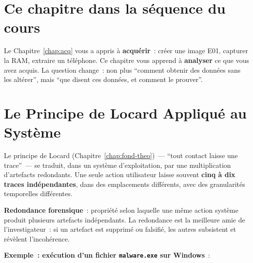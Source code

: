 \bigskip

\section*{Ce chapitre dans la séquence du cours}

Le Chapitre~\ref{chap:acq} vous a appris à \textbf{acquérir}~: créer
une image E01, capturer la RAM, extraire un téléphone. Ce chapitre vous
apprend à \textbf{analyser} ce que vous avez acquis. La question change~:
non plus ``comment obtenir des données sans les altérer'', mais
``que disent ces données, et comment le prouver''.

\separateur

\section{Le Principe de Locard Appliqué au Système}
\label{sec:locard-systeme}

Le principe de Locard (Chapitre~\ref{chap:fond-theo})~--- ``tout contact
laisse une trace''~--- se traduit, dans un système d'exploitation, par
une multiplication d'artefacts redondants. Une seule action utilisateur
laisse souvent \textbf{cinq à dix traces indépendantes}, dans des
emplacements différents, avec des granularités temporelles différentes.

\begin{boxdef}
\textbf{Redondance forensique}~: propriété
selon laquelle une même action système produit plusieurs artefacts
indépendants. La redondance est la meilleure amie de l'investigateur~:
si un artefact est supprimé ou falsifié, les autres subsistent et
révèlent l'incohérence.
\end{boxdef}

\textbf{Exemple~: exécution d'un fichier \texttt{malware.exe} sur Windows}~:

